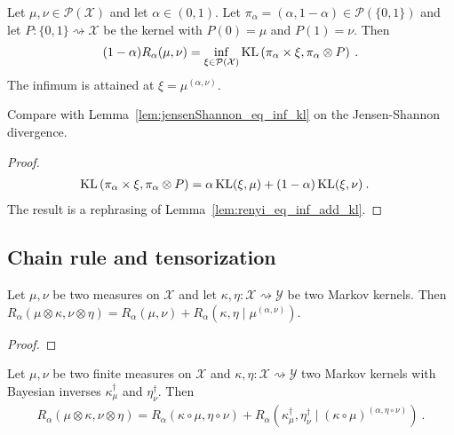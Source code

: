 \begin{lemma}
  \label{lem:renyi_eq_inf_kl}
  Let $\mu, \nu \in \mathcal P(\mathcal X)$ and let $\alpha \in (0, 1)$. Let $\pi_\alpha = (\alpha, 1 - \alpha) \in \mathcal P(\{0,1\})$ and let $P : \{0,1\} \rightsquigarrow \mathcal X$ be the kernel with $P(0) = \mu$ and $P(1) = \nu$. Then
  \begin{align*}
  (1 - \alpha) R_\alpha(\mu, \nu) = \inf_{\xi \in \mathcal P(\mathcal X)} \operatorname{KL}\left( \pi_\alpha \times \xi, \pi_\alpha \otimes P \right) \: .
  \end{align*}
  The infimum is attained at $\xi = \mu^{(\alpha, \nu)}$.
\end{lemma}

Compare with Lemma~\ref{lem:jensenShannon_eq_inf_kl} on the Jensen-Shannon divergence.

\begin{proof}%
{}
\begin{align*}
\operatorname{KL}\left( \pi_\alpha \times \xi, \pi_\alpha \otimes P \right)
&= \alpha \operatorname{KL}(\xi, \mu) + (1 - \alpha) \operatorname{KL}(\xi, \nu)
\: .
\end{align*}
The result is a rephrasing of Lemma~\ref{lem:renyi_eq_inf_add_kl}.
\end{proof}

\subsection{Chain rule and tensorization}

\begin{theorem}
  \label{thm:renyi_chain_rule}
  Let $\mu, \nu$ be two measures on $\mathcal X$ and let $\kappa, \eta : \mathcal X \rightsquigarrow \mathcal Y$ be two Markov kernels.
  Then $R_\alpha(\mu \otimes \kappa, \nu \otimes \eta) = R_\alpha(\mu, \nu) + R_\alpha(\kappa, \eta \mid \mu^{(\alpha, \nu)})$.
\end{theorem}

\begin{proof}%
{}
\end{proof}


\begin{theorem}
  \label{thm:renyi_compProd_bayesInv}
  Let $\mu, \nu$ be two finite measures on $\mathcal X$ and $\kappa, \eta : \mathcal X \rightsquigarrow \mathcal Y$ two Markov kernels with Bayesian inverses $\kappa_\mu^\dagger$ and $\eta_\nu^\dagger$.
  Then 
  \begin{align*}
  R_\alpha(\mu \otimes \kappa, \nu \otimes \eta)
  = R_\alpha(\kappa \circ \mu, \eta \circ \nu) + R_\alpha(\kappa_\mu^\dagger, \eta_\nu^\dagger \mid (\kappa \circ \mu)^{(\alpha, \eta \circ \nu)})
  \: .
  \end{align*}
\end{theorem}

